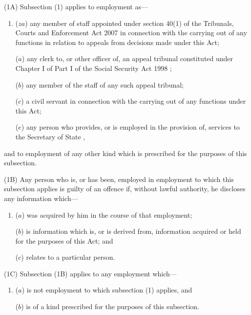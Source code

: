 \documentclass[12pt,a4paper]{article}
\begin{document}
(1A) Subsection (1) applies to employment as—
\begin{enumerate}\item[]
($za$) any member of staff appointed under section 40(1) of the Tribunals, Courts and Enforcement Act 2007 in connection with the carrying out of any functions in relation to appeals from decisions made under this Act;

($a$) any clerk to, or other officer of, an appeal tribunal
constituted under Chapter I of Part I of the Social Security Act 1998%
;

($b$) any member of the staff of 
any such  %
appeal tribunal;

($c$) a civil servant in connection with the carrying out of any functions under this Act;


($e$) any person who provides, or is employed in the provision of, services to the 
Secretary of State%
,
\end{enumerate}
and to employment of any other kind which is prescribed for the purposes of this subsection.

(1B) Any person who is, or has been, employed in employment to which this subsection applies is guilty of an offence if, without lawful authority, he discloses any information which—
\begin{enumerate}\item[]
($a$) was acquired by him in the course of that employment;

($b$) is information which is, or is derived from, information acquired or held for the purposes of this Act; and

($c$) relates to a particular person.
\end{enumerate}

(1C) Subsection (1B) applies to any employment which—
\begin{enumerate}\item[]
($a$) is not employment to which subsection (1) applies, and

($b$) is of a kind prescribed for the purposes of this subsection.
\end{enumerate}
\end{document}
